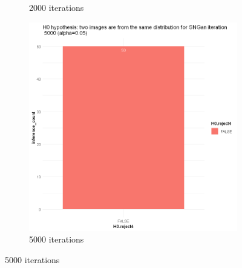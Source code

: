\documentclass{article}
\begin{document}
\begin{figure}[h!]
\begin{subfigure}[b]{0.3\textwidth}
         \caption{2000 iterations}
     \end{subfigure}
     \hfill
     \begin{subfigure}[b]{0.3\textwidth}
         \centering
         \includegraphics[width=\textwidth]{kmmd_figures/sngan_face_5000.png}
         \caption{5000 iterations}
     \end{subfigure}
\end{figure}
\end{document}
